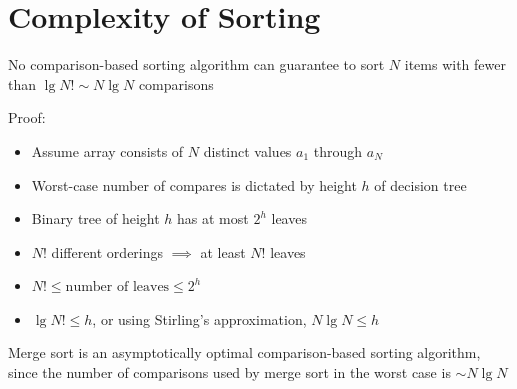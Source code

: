 \documentclass[8pt,a4paper,compress]{beamer}
\begin{document}
\section{Complexity of Sorting}
\begin{frame}[fragile]
\pause

No comparison-based sorting algorithm can guarantee to sort $N$ items with fewer than $\lg N! \sim N\lg N$ comparisons

\pause
\bigskip

\begin{minipage}{150pt}
Proof: \begin{itemize}
\item Assume array consists of $N$ distinct values $a_1$ through $a_N$
\item Worst-case number of compares is dictated by height $h$ of decision tree
\item Binary tree of height $h$ has at most $2^h$ leaves
\item $N!$ different orderings $\implies$ at least $N!$ leaves
\item $N! \leq \text{number of leaves} \leq 2^h$
\item $\lg N! \leq h$, or using Stirling's approximation, $N\lg N \leq h$
\end{itemize}
\end{minipage}
\begin{minipage}{150pt}
\end{minipage}

\pause
\bigskip

Merge sort is an asymptotically optimal comparison-based sorting algorithm, since the number of comparisons used by merge sort in the worst case is $\sim N\lg N$
\end{frame}
\end{document}
